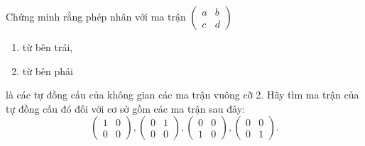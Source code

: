 \documentclass[class=linearalgebra,crop=false]{standalone}
\begin{document}
\begin{exercise}
    Chứng minh rằng phép nhân với ma trận $\begin{pmatrix}a & b \\ c & d\end{pmatrix}$
    \begin{enumerate}[label = (\alph*)]
        \item từ bên trái,
        \item từ bên phải
    \end{enumerate}
    \par là các tự đồng cấu của không gian các ma trận vuông cỡ 2. Hãy tìm ma trận của tự đồng cấu đó đối với cơ sở gồm các ma trận sau đây:
    \[
        \begin{pmatrix}
            1 & 0 \\
            0 & 0
        \end{pmatrix},
        \begin{pmatrix}
            0 & 1 \\
            0 & 0
        \end{pmatrix},
        \begin{pmatrix}
            0 & 0 \\
            1 & 0
        \end{pmatrix},
        \begin{pmatrix}
            0 & 0 \\
            0 & 1
        \end{pmatrix}.
    \]
\end{exercise}
\end{document}
